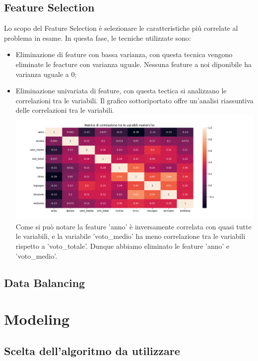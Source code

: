 \documentclass[a4paper, 10pt]{report}
\begin{document}
    \section{Feature Selection}\label{sec:feature-selection}
    Lo scopo del Feature Selection è selezionare le caratteristiche più correlate al problema in esame.
    In questa fase, le tecniche utilizzate sono:
    \begin{itemize}
        \item Eliminazione di feature con bassa varianza, con questa tecnica vengono eliminate le feacture
        con varianza uguale. Nessuna feature a noi diponibile ha varianza uguale a 0;
        \item Eliminazione univariata di feature, con questa tectica si analizzano le correlazioni tra le variabili.
        Il grafico sottoriportato offre un'analisi riassuntiva delle correlazioni tra le variabili.
        \includegraphics[width=50cm]{dataPreparation/matriceCorrelazione.png}
        Come si può notare la feature 'anno' è inversamente correlata con quasi tutte le variabili, e la variabile
        'voto\_medio' ha meno correlazione tra le variabili rispetto a 'voto\_totale'.
        Dunque abbiamo eliminato le feature 'anno' e 'voto\_medio'.
    \end{itemize}

    \section{Data Balancing}\label{sec:data-balancing}



    \chapter{Modeling}\label{ch:modeling}


    \section{Scelta dell'algoritmo da utilizzare}\label{sec:scelta-dell'algoritmo-da-utilizzare}
\end{document}
